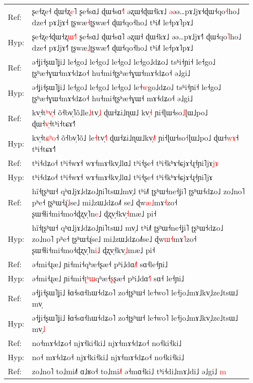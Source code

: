 \documentclass[10pt]{article}
\DeclareRobustCommand{\hl}[1]{{\textcolor{red}{#1}}}
\begin{document}
\begin{longtable}{ll}
\midrule 
Ref: & ʂe˧ʐe˧\hl{ }ɖɯ˧ʐ\hl{e}˥ ʂe˧sɑ˩ ɖɯ˧sɑ\hl{˧}˥ əʐɯ˧ɖɯ˧kɤ˩ \hl{ə}əə…pɤ˩jɤ˧ɖɯ˧qo\hl{˧}ho˩ dze˧ pɤ˩jɤ˧ ʈʂwæ\hl{˧}ʈʂwæ˧ ɖɯ˧qo˧ho˩ tʰi˩˥ le˧pɤ˥pɤ˩ \\ 
Hyp: & ʂe˧ʐe˧ɖɯ˧ʐ\hl{ɯ}\hl{˧}˥ ʂe˧sɑ˩ ɖɯ˧sɑ˥ əʐɯ˧\hl{ }ɖɯ˧kɤ˩ əə…pɤ˩jɤ˧\hl{˥}\hl{ }ɖɯ˧qo\hl{˥}ho˩ dze˧ pɤ˩jɤ˧\hl{˥} ʈʂwæ\hl{˩}ʈʂwæ˧\hl{˥} ɖɯ˧qo˧ho˩ tʰi˩˥ le˧pɤ˥pɤ˩ \\ 
\midrule 
Ref: & ə˧ʝi˧ʂɯ˥ʝi˩ le˧go˩ le˧go˩ le˧go˩ le˧go˩dʑo˩ tsʰi˧ɲi˧ le˧go˩ ʈʂʰæ˧ɣɯ˧mɤ˧dʑo˧ hu˧mi˧ʈʂʰæ˧ɣɯ˧mɤ˧dʑo˧ ə˩gi˩ \\ 
Hyp: & ə˧ʝi˧ʂɯ˥ʝi˩ le˧go˩ le˧go˩ le˧go˩ le˧\hl{w}go˩dʑo˩ tsʰi˧ɲi˧ le˧go˩ ʈʂʰæ˧ɣɯ˧mɤ˧dʑo˧ hu˧mi˧ʈʂʰæ˧ɣɯ˧\hl{ }mɤ˧dʑo˧ ə˩gi˩ \\ 
\midrule 
Ref: & kv̩˧t\hl{ʰ}\hl{v}\hl{̩}˧ õ˧bv̩˥õ˩le\hl{˩}tv̩\hl{˩} ɖɯ˧ʑi˩ɳɯ˩\hl{ }kv̩\hl{˧} ɲi˧ɭɯ˧so\hl{˩}ɭɯ˩po˩ ɖɯ˧\hl{v}\hl{̩}˧tʰi˧tɕɤ˧˥ \\ 
Hyp: & kv̩˧t\hl{ɕ}\hl{ʰ}\hl{o}˧ õ˧bv̩˥õ˩\hl{ }le\hl{˧}tv̩\hl{˧}\hl{˥} ɖɯ˧ʑi˩ɳɯ˩kv̩\hl{˩}\hl{˥} ɲi˧ɭɯ˧so\hl{˧}ɭɯ˩po˩ ɖɯ˧\hl{w}\hl{ɤ}˧\hl{ }tʰi˧tɕɤ˧˥ \\ 
\midrule 
Ref: & tʰi˧dʑo˧ tʰi˧wɤ˧ wɤ˧mɤ˧kv̩˩lɑ˩ tʰi˧ʂe˧ tʰi˧kʰɤ˧ɕjɤ˧ɻ˧ɲi˥jɤ\hl{j}\hl{ɤ} \\ 
Hyp: & tʰi˧dʑo˧ tʰi˧wɤ˧ wɤ˧mɤ˧kv̩˩lɑ˩ tʰi˧ʂe˧ tʰi˧kʰɤ˧ɕjɤ˧ɻ˧ɲi˥jɤ \\ 
\midrule 
Ref: & hĩ˧ʈʂʰɯ˧ qʰɑ˩jɤ˩dʑo˩ɲi˥tsɯ˩mv̩˩ tʰi˩˥ ʈʂʰɯ˧ne˧ʝi˥ ʈʂʰɯ˧dʑo˩ zo˩no˥ pʰe˧ ʈʂʰɯ˧ɻ̍\hl{˩}se˩ mi˩zɯ˩dʑo˩˥\hl{ }se˩ ɖw\hl{æ}\hl{˩}mɤ\hl{˧}zo˧ ʂɯ˧ɬi˧mi˧mo˧ɖʐv̩˥n\hl{e}˩ ɖʐv̩˧kv̩\hl{˧}mæ˩ pi˧ \\ 
Hyp: & hĩ˧ʈʂʰɯ˧ qʰɑ˩jɤ˩dʑo˩ɲi˥tsɯ˩\hl{ }mv̩˩ tʰi˩˥ ʈʂʰɯ˧ne˧ʝi˥ ʈʂʰɯ˧dʑo˩ zo˩no˥ pʰe˧ ʈʂʰɯ˧ɻ̍se˩ mi˩zɯ˩dʑo˩˥se˩ ɖw\hl{ɯ}\hl{˧}mɤ\hl{˥}zo˧ ʂɯ˧ɬi˧mi˧mo˧ɖʐv̩˥n\hl{i}˩ ɖʐv̩˧kv̩\hl{˩}mæ˩ pi˧ \\ 
\midrule 
Ref: & ə˧mi˧ɻæ˩ ɲi˧mi˧qʰæ˧ʂæ˧ pʰi˩dɑ\hl{˩}˥ sɑ˧le˧ɲi˩ \\ 
Hyp: & ə˧mi˧ɻæ˩ ɲi˧mi˧\hl{ʈ}\hl{ʰ}\hl{ɯ}qʰæ˧\hl{ʂ}ʂæ˧ pʰi˩dɑ\hl{˧}˥ sɑ˧\hl{ }le˧ɲi˩ \\ 
\midrule 
Ref: & ə˧ʝi˧ʂɯ˥ʝi˩ ɬɑ˧sɑ˧hɯ˧dʑo˥ zo˧ʈʂʰɯ˧ le˧wo˥ le˧jo˩mɤ˩kv̩˩ze˩tsɯ˩ mv̩ \\ 
Hyp: & ə˧ʝi˧ʂɯ˥ʝi˩ ɬɑ˧sɑ˧hɯ˧dʑo˥ zo˧ʈʂʰɯ˧ le˧wo˥ le˧jo˩mɤ˩kv̩˩ze˩tsɯ˩ mv̩\hl{˩} \\ 
\midrule 
Ref: & no˧mɤ˧dʑo˧ njɤ˧ki˧ki˩ njɤ˧mɤ˧dʑo˧ no˧ki˧ki˩ \\ 
Hyp: & no˧\hl{ }mɤ˧dʑo˧ njɤ˧ki˧ki˩ njɤ˧mɤ˧dʑo˧ no˧ki˧ki˩ \\ 
\midrule 
Ref: & zo˩no˥ to˩mi˩˥ ɑ˩ʁo˧ to˩mi\hl{˩}˥ ə˧mɑ˧ki˩ tʰi˧di˩mɤ˩di˩ ə˩gi˩ \hl{m} \\ 

\end{longtable}
\end{document}
